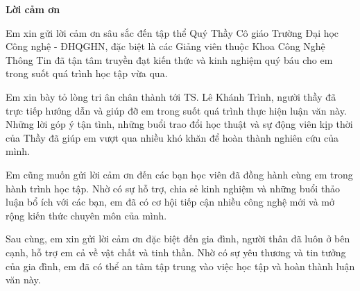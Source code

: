 \begin{center}
	\textbf{\large{Lời cảm ơn}}
\end{center}
Em xin gửi lời cảm ơn sâu sắc đến tập thể Quý Thầy Cô giáo Trường Đại học Công nghệ - ĐHQGHN, đặc biệt là các Giảng viên thuộc Khoa Công Nghệ Thông Tin đã tận tâm truyền đạt kiến thức và kinh nghiệm quý báu cho em trong suốt quá trình học tập vừa qua.

Em xin bày tỏ lòng tri ân chân thành tới TS. Lê Khánh Trình, người thầy đã trực tiếp hướng dẫn và giúp đỡ em trong suốt quá trình thực hiện luận văn này. Những lời góp ý tận tình, những buổi trao đổi học thuật và sự động viên kịp thời của Thầy đã giúp em vượt qua nhiều khó khăn để hoàn thành nghiên cứu của mình.

Em cũng muốn gửi lời cảm ơn đến các bạn học viên đã đồng hành cùng em trong hành trình học tập. Nhờ có sự hỗ trợ, chia sẻ kinh nghiệm và những buổi thảo luận bổ ích với các bạn, em đã có cơ hội tiếp cận nhiều công nghệ mới và mở rộng kiến thức chuyên môn của mình.

Sau cùng, em xin gửi lời cảm ơn đặc biệt đến gia đình, người thân đã luôn ở bên cạnh, hỗ trợ em cả về vật chất và tinh thần. Nhờ có sự yêu thương và tin tưởng của gia đình, em đã có thể an tâm tập trung vào việc học tập và hoàn thành luận văn này.
